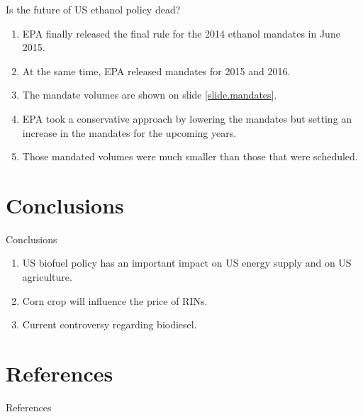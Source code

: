 \documentclass[table,xcolor=pdftex,dvipsnames]{beamer}\usepackage[]{graphicx}\usepackage[]{color}
\begin{document}

\begin{frame}{Is the future of US ethanol policy dead?}
\begin{enumerate}[label=\textbullet]
    \item EPA finally released the final rule for the 2014 ethanol mandates in June 2015.
    \item At the same time, EPA released mandates for 2015 and 2016.
    \item The mandate volumes are shown on slide \ref{slide.mandates}.
    \item EPA took a conservative approach by lowering the mandates but setting an increase in the mandates for the upcoming years.
    \item Those mandated volumes were much smaller than those that were scheduled.
\end{enumerate}
\end{frame}


\section{Conclusions}

\begin{frame}{Conclusions}
\begin{enumerate}[label=\textbullet]
    \item US biofuel policy has an important impact on US energy supply and on US agriculture.
    \item Corn crop will influence the price of RINs.
    \item Current controversy regarding biodiesel.
\end{enumerate}
\end{frame}


\section[References]{References}
\renewcommand\refname{References}
\def\newblock{References}
\begin{frame}{References}%

%
%
\end{frame}


\end{document}
